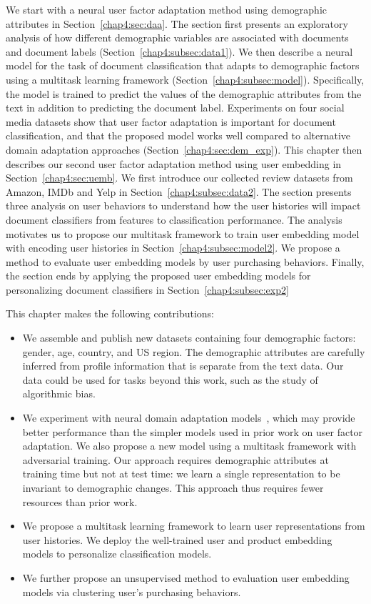 We start with a neural user factor adaptation method using demographic attributes in Section~\ref{chap4:sec:daa}.
The section first presents an exploratory analysis of how different demographic variables are associated with documents and document labels (Section~\ref{chap4:subsec:data1}).
We then describe a neural model for the task of document classification that adapts to demographic factors using a multitask learning framework (Section~\ref{chap4:subsec:model}). Specifically, the model is trained to predict the values of the demographic attributes from the text in addition to predicting the document label. 
Experiments on four social media datasets show that user factor adaptation is important for document classification, and that the proposed model works well compared to alternative domain adaptation approaches (Section~\ref{chap4:sec:dem_exp}).
This chapter then describes our second user factor adaptation method using user embedding in Section~\ref{chap4:sec:uemb}.
We first introduce our collected review datasets from Amazon, IMDb and Yelp in Section~\ref{chap4:subsec:data2}.
The section presents three analysis on user behaviors to understand how the user histories will impact document classifiers from features to classification performance.
The analysis motivates us to propose our multitask framework to train user embedding model with encoding user histories in Section~\ref{chap4:subsec:model2}. 
We propose a method to evaluate user embedding models by user purchasing behaviors. 
Finally, the section ends by applying the proposed user embedding models for personalizing document classifiers in Section~\ref{chap4:subsec:exp2}

This chapter makes the following contributions:

\begin{itemize}
    \item We assemble and publish new datasets containing four demographic factors: gender, age, country, and US region. The demographic attributes are carefully inferred from profile information that is separate from the text data. Our data could be used for tasks beyond this work, such as the study of algorithmic bias.
    \item We experiment with neural domain adaptation models~\cite{ganin2016domain}, which may provide better performance than the simpler models used in prior work on user factor adaptation. We also propose a new model using a multitask framework with adversarial training. Our approach requires demographic attributes at training time but not at test time: we learn a single representation to be invariant to demographic changes. This approach thus requires fewer resources than prior work.
    \item We propose a multitask learning framework to learn user representations from user histories. We deploy the well-trained user and product embedding models to personalize classification models. 
    \item We further propose an unsupervised method to evaluation user embedding models via clustering user's purchasing behaviors.
\end{itemize}


